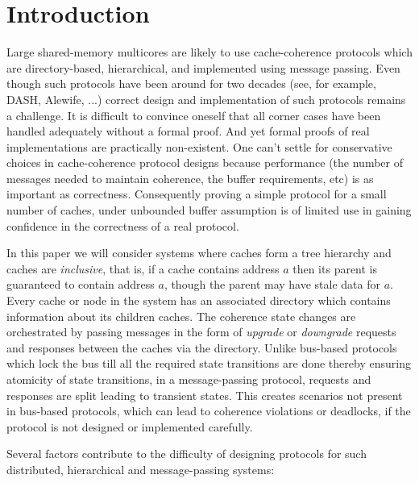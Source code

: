 \section{Introduction} 

Large shared-memory multicores are likely to use cache-coherence protocols
which are directory-based, hierarchical, and implemented using message passing.
Even though such protocols have been around for two decades (see, for example,
DASH\cite{DASH}, Alewife\cite{Anant}, ...) correct design and implementation of
such protocols remains a challenge. It is difficult to convince oneself that
all corner cases have been handled adequately without a formal proof. And yet
formal proofs of real implementations are practically non-existent. One can't
settle for conservative choices in cache-coherence protocol designs because
performance (\eg the number of messages needed to maintain coherence, the
buffer requirements, etc) is as important as correctness. Consequently proving
a simple protocol for a small number of caches, under unbounded buffer
assumption is of limited use in gaining confidence in the correctness of a real
protocol. 

In this paper we will consider systems where caches form a tree hierarchy and
caches are \emph{inclusive}, that is, if a cache contains address $a$ then its
parent is guaranteed to contain address $a$, though the parent may have stale
data for $a$. Every cache or node in the system has an associated directory
which contains information about its children caches. The coherence state
changes are orchestrated by passing messages in the form of \emph{upgrade} or
\emph{downgrade} requests and responses between the caches via the directory.
Unlike bus-based protocols which lock the bus till all the required state
transitions are done thereby ensuring atomicity of state transitions, in a
message-passing protocol, requests and responses are split leading to transient
states. This creates scenarios not present in bus-based protocols, which can
lead to coherence violations or deadlocks, if the protocol is not designed or
implemented carefully.

Several factors contribute to the difficulty of designing protocols for such
distributed, hierarchical and message-passing systems:

